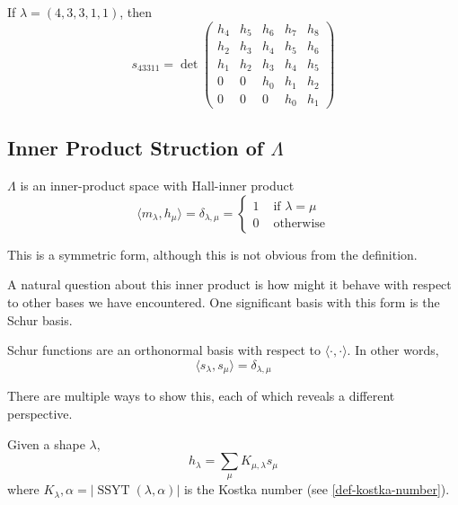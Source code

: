 \documentclass[11pt,leqno,oneside]{amsart}
\numberwithin{thm}{section}
\newcommand{\SSYT}{\operatorname{SSYT}} %
\newcommand{\sym}{\Lambda}
\begin{document}
\begin{example}
  If \(\lambda = (4,3,3,1,1)\), then \[
    s_{43311} = \det \left(
      \begin{array}{ccccc}
        h_4&h_5&h_6&h_7&h_8\\
        h_2&h_3&h_4&h_5&h_6\\
        h_1&h_2&h_3&h_4&h_5\\
        0&0&h_0&h_1&h_2\\
        0&0&0&h_0&h_1
      \end{array}
\right)
  \]
\end{example}
\subsection{Inner Product Struction of \(\sym\)}
\begin{prop}
  \(\sym\) is an inner-product space with Hall-inner product \[
    \langle m_\lambda, h_\mu \rangle = \delta_{\lambda,\mu} =
    \begin{cases}
      1 & \text{ if }\lambda=\mu\\
      0 & \text{ otherwise}
    \end{cases}
  \]
\end{prop}
\begin{rmk}
  This is a symmetric form, although this is not obvious from the
  definition. 
\end{rmk}
A natural question about this inner product is how might it behave
with respect to other bases we have encountered. One significant basis
with this form is the Schur basis.
\begin{thm}\label{schurs-are-orthonormal}
  Schur functions are an orthonormal basis with respect to \(\langle
  \cdot, \cdot \rangle\). In other words, \[
    \langle s_\lambda, s_\mu \rangle = \delta_{\lambda,\mu}
  \]
\end{thm}
There are multiple ways to show this, each of which reveals a
different perspective.
\begin{lem}
  Given a shape \(\lambda\), \[
    h_\lambda = \sum_\mu K_{\mu,\lambda} s_\mu
  \]
  where \(K_\lambda,\alpha = |\SSYT(\lambda,\alpha)|\) is the Kostka
  number (see \ref{def-kostka-number}).
\end{lem}
\end{document}
